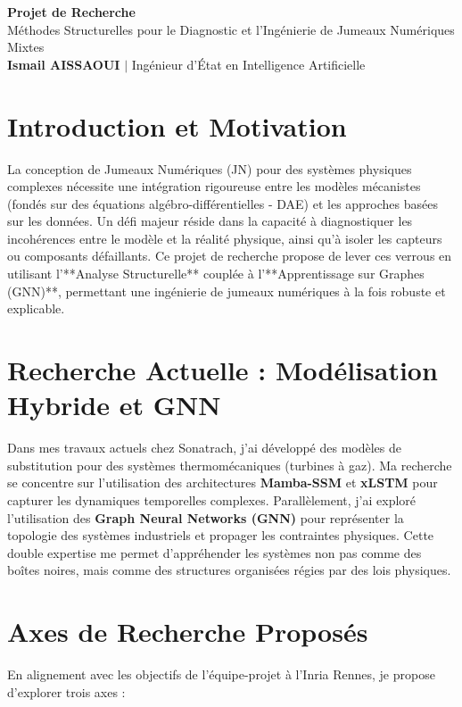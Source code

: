 \documentclass[11pt,a4paper]{article}
\begin{document}
\begin{center}
    {\LARGE\bfseries\color{titleblue} Projet de Recherche}\\[6pt]
    {\large Méthodes Structurelles pour le Diagnostic et l'Ingénierie de Jumeaux Numériques Mixtes}\\[4pt]
    \textbf{Ismail AISSAOUI} $|$ Ingénieur d'État en Intelligence Artificielle
\end{center}

\bigskip

\section{Introduction et Motivation}
La conception de Jumeaux Numériques (JN) pour des systèmes physiques complexes nécessite une intégration rigoureuse entre les modèles mécanistes (fondés sur des équations algébro-différentielles - DAE) et les approches basées sur les données. Un défi majeur réside dans la capacité à diagnostiquer les incohérences entre le modèle et la réalité physique, ainsi qu'à isoler les capteurs ou composants défaillants. Ce projet de recherche propose de lever ces verrous en utilisant l'**Analyse Structurelle** couplée à l'**Apprentissage sur Graphes (GNN)**, permettant une ingénierie de jumeaux numériques à la fois robuste et explicable.

\section{Recherche Actuelle : Modélisation Hybride et GNN}
Dans mes travaux actuels chez Sonatrach, j'ai développé des modèles de substitution pour des systèmes thermomécaniques (turbines à gaz). Ma recherche se concentre sur l'utilisation des architectures \textbf{Mamba-SSM} et \textbf{xLSTM} pour capturer les dynamiques temporelles complexes. Parallèlement, j'ai exploré l'utilisation des \textbf{Graph Neural Networks (GNN)} pour représenter la topologie des systèmes industriels et propager les contraintes physiques. Cette double expertise me permet d'appréhender les systèmes non pas comme des boîtes noires, mais comme des structures organisées régies par des lois physiques.

\section{Axes de Recherche Proposés}
En alignement avec les objectifs de l'équipe-projet à l'Inria Rennes, je propose d'explorer trois axes :
\end{document}
